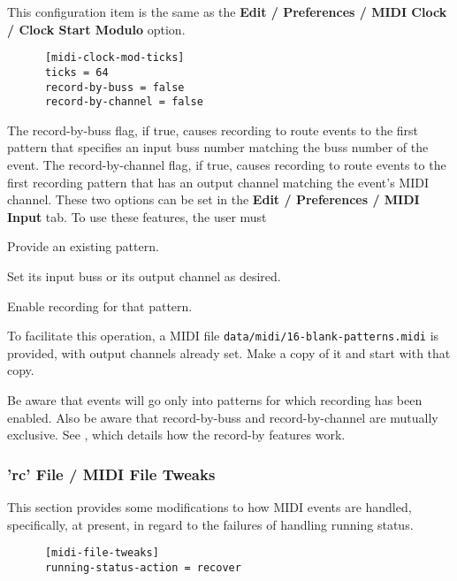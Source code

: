    This configuration item is the same as the
   \textbf{Edit / Preferences / MIDI Clock / Clock Start Modulo} option.

   \begin{verbatim}
      [midi-clock-mod-ticks]
      ticks = 64
      record-by-buss = false
      record-by-channel = false
   \end{verbatim}

   The record-by-buss flag, if true, causes recording to route
   events to the first pattern that specifies an input buss number matching
   the buss number of the event.
   The record-by-channel flag, if true, causes recording to route
   events to the first recording pattern that has an output channel
   matching the event's MIDI channel.
   These two options can be set in the \textbf{Edit / Preferences / MIDI Input}
   tab.
   To use these features, the user must

   \begin{enumber}
      \item Provide an existing pattern.
      \item Set its input buss or its output channel as desired.
      \item Enable recording for that pattern.
   \end{enumber}

   To facilitate this operation, a MIDI file
   \texttt{data/midi/16-blank-patterns.midi}
   is provided, with output channels already set.
   Make a copy of it and start with that copy.

   Be aware that events will go only into patterns for which recording has been
   enabled. Also be aware that record-by-buss and record-by-channel are
   mutually exclusive.
   See , which details how the record-by features
   work.

\subsubsection{'rc' File / MIDI File Tweaks}
\label{subsubsec:configuration_rc_midi_file_tweaks}

   This section provides some modifications to how MIDI events are handled,
   specifically, at present, in regard to the failures of handling running
   status.

   \begin{verbatim}
      [midi-file-tweaks]
      running-status-action = recover
   \end{verbatim}

